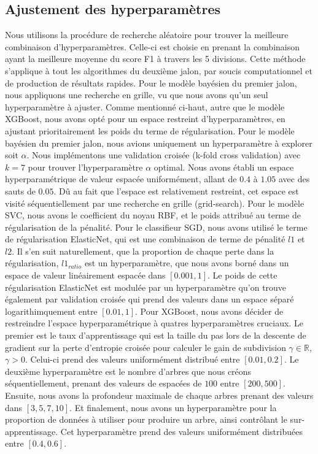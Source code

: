 \documentclass{article}
\begin{document}
\subsection{Ajustement des hyperparamètres}
Nous utilisons la procédure de recherche aléatoire pour trouver la meilleure combinaison d'hyperparamètres. Celle-ci est choisie en prenant la combinaison ayant la meilleure moyenne du score F1 à travers les 5 divisions. Cette méthode s'applique à tout les algorithmes du deuxième jalon, par soucis computationnel et de production de résultats rapides. Pour le modèle bayésien du premier jalon, nous appliquons une recherche en grille, vu que nous avons qu'un seul hyperparamètre à ajuster. Comme mentionné ci-haut, autre que le modèle XGBoost, nous avons opté pour un espace restreint d'hyperparamètres, en ajustant prioritairement les poids du terme de régularisation. 
Pour le modèle bayésien du premier jalon, nous avions uniquement un hyperparamètre à explorer soit $\alpha$. Nous implémentons une validation croisée (k-fold cross validation) avec $k = 7$ pour trouver l'hyperparamètre $\alpha$ optimal. Nous avons établi un espace hyperparamétrique de valeur espacée uniformément, allant de $0.4$ à $1.05$ avec des sauts de $0.05$. Dû au fait que l'espace est relativement restreint, cet espace est visité séquentiellement par une recherche en grille (grid-search). Pour le modèle SVC, nous avons le coefficient du noyau RBF, et le poids attribué au terme de régularisation de la pénalité. Pour le classifieur SGD, nous avons utilisé le terme de régularisation ElasticNet, qui est une combinaison de terme de pénalité $l1$ et $l2$. Il s'en suit naturellement, que la proportion de chaque perte dans la régularisation, $l1_{ratio}$ est un hyperparamètre, que nous avons borné dans un espace de valeur linéairement espacée dans $[0.001, 1]$. Le poids de cette régularisation ElasticNet est modulée par un hyperparamètre qu'on trouve également par validation croisée qui prend des valeurs dans un espace séparé logarithimquement entre $[0.01, 1]$. Pour XGBoost, nous avons décider de restreindre l'espace hyperparamétrique à quatres hyperparamètres cruciaux. Le premier est le taux d'apprentissage qui est la taille du pas lors de la descente de gradient sur la perte d'entropie croisée pour calculer le gain de subdivision $\gamma \in \mathbb{R}$, $\gamma > 0$. Celui-ci prend des valeurs uniformément distribué entre $[0.01, 0.2]$. Le deuxième hyperparamètre est le nombre d'arbres que nous créons séquentiellement, prenant des valeurs de espacées de $100$ entre $[200, 500]$. Ensuite, nous avons la profondeur maximale de chaque arbres prenant des valeurs dans $[3, 5, 7, 10]$. Et finalement, nous avons un hyperparamètre pour la proportion de données à utiliser pour produire un arbre, ainsi contrôlant le sur-apprentissage. Cet hyperparamètre prend des valeurs uniformément distribuées entre $[0.4, 0.6]$.
\end{document}
